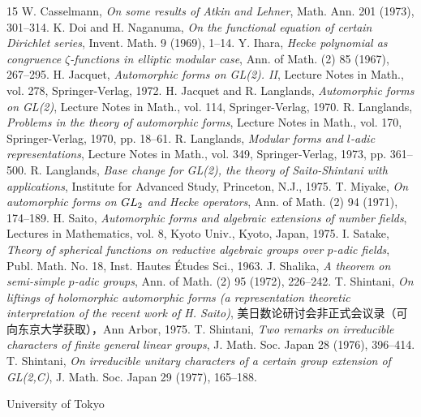 \begin{thebibliography}{15}
 W. Casselmann, \emph{On some results of Atkin and Lehner}, Math. Ann. 201 (1973), 301--314.
 K. Doi and H. Naganuma, \emph{On the functional equation of certain Dirichlet series}, Invent. Math. 9 (1969), 1--14.
 Y. Ihara, \emph{Hecke polynomial as congruence $\zeta$-functions in elliptic modular case}, Ann. of Math. (2) 85 (1967), 267--295.
 H. Jacquet, \emph{Automorphic forms on GL(2). II}, Lecture Notes in Math., vol. 278, Springer-Verlag, 1972.
 H. Jacquet and R. Langlands, \emph{Automorphic forms on GL(2)}, Lecture Notes in Math., vol. 114, Springer-Verlag, 1970.
 R. Langlands, \emph{Problems in the theory of automorphic forms}, Lecture Notes in Math., vol. 170, Springer-Verlag, 1970, pp. 18--61.
 R. Langlands, \emph{Modular forms and $l$-adic representations}, Lecture Notes in Math., vol. 349, Springer-Verlag, 1973, pp. 361--500.
 R. Langlands, \emph{Base change for GL(2), the theory of Saito-Shintani with applications}, Institute for Advanced Study, Princeton, N.J., 1975.
 T. Miyake, \emph{On automorphic forms on $GL_2$ and Hecke operators}, Ann. of Math. (2) 94 (1971), 174--189.
 H. Saito, \emph{Automorphic forms and algebraic extensions of number fields}, Lectures in Mathematics, vol. 8, Kyoto Univ., Kyoto, Japan, 1975.
 I. Satake, \emph{Theory of spherical functions on reductive algebraic groups over $p$-adic fields}, Publ. Math. No. 18, Inst. Hautes Études Sci., 1963.
 J. Shalika, \emph{A theorem on semi-simple $p$-adic groups}, Ann. of Math. (2) 95 (1972), 226--242.
 T. Shintani, \emph{On liftings of holomorphic automorphic forms (a representation theoretic interpretation of the recent work of H. Saito)}, 美日数论研讨会非正式会议录（可向东京大学获取），Ann Arbor, 1975.
 T. Shintani, \emph{Two remarks on irreducible characters of finite general linear groups}, J. Math. Soc. Japan 28 (1976), 396--414.
 T. Shintani, \emph{On irreducible unitary characters of a certain group extension of GL(2,C)}, J. Math. Soc. Japan 29 (1977), 165--188.
\end{thebibliography}
\begin{flushleft}\small University of Tokyo\end{flushleft}
